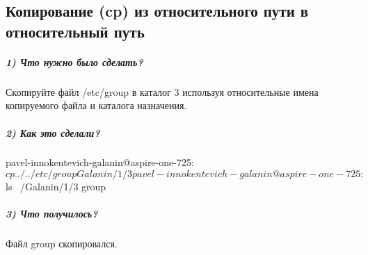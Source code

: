 \subsection{Копирование (cp) из относительного пути в относительный путь}

\subparagraph{1) Что нужно было сделать?}

Скопируйте файл /etc/group в каталог 3 используя относительные имена копируемого файла и каталога назначения.

\subparagraph{2) Как это сделали?}

\begin{MyVerbatimCode}[label=Debian terminal]
pavel-innokentevich-galanin@aspire-one-725:~$ cp ../../etc/group Galanin/1/3
pavel-innokentevich-galanin@aspire-one-725:~$ ls ~/Galanin/1/3
group
\end{MyVerbatimCode}

\subparagraph{3) Что получилось?}

Файл group скопировался.
